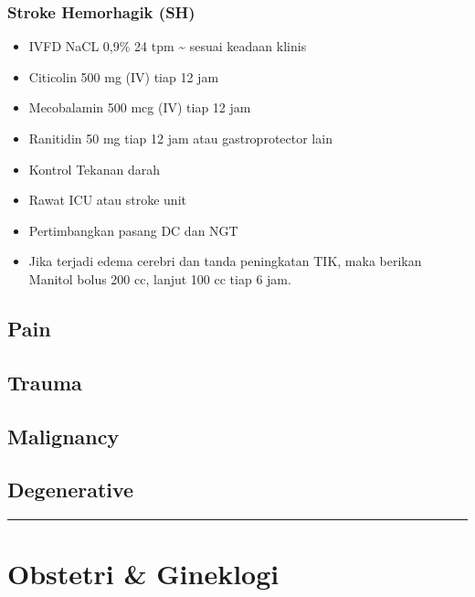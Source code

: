 \documentclass[
]{book}
\providecommand{\tightlist}{%
  \setlength{\itemsep}{0pt}\setlength{\parskip}{0pt}}
\begin{document}
\hypertarget{stroke-hemorhagik-sh}{%
\subsubsection{Stroke Hemorhagik (SH)}\label{stroke-hemorhagik-sh}}

\begin{itemize}
\tightlist
\item
  IVFD NaCL 0,9\% 24 tpm \textasciitilde{} sesuai keadaan klinis
\item
  Citicolin 500 mg (IV) tiap 12 jam
\item
  Mecobalamin 500 mcg (IV) tiap 12 jam
\item
  Ranitidin 50 mg tiap 12 jam atau gastroprotector lain
\item
  Kontrol Tekanan darah
\item
  Rawat ICU atau stroke unit
\item
  Pertimbangkan pasang DC dan NGT
\item
  Jika terjadi edema cerebri dan tanda peningkatan TIK, maka berikan Manitol bolus 200 cc, lanjut 100 cc tiap 6 jam.
\end{itemize}

\hypertarget{pain}{%
\subsection{Pain}\label{pain}}

\hypertarget{trauma-1}{%
\subsection{Trauma}\label{trauma-1}}

\hypertarget{malignancy-3}{%
\subsection{Malignancy}\label{malignancy-3}}

\hypertarget{degenerative}{%
\subsection{Degenerative}\label{degenerative}}

\begin{center}\rule{0.5\linewidth}{0.5pt}\end{center}

\hypertarget{obstetri-gineklogi-1}{%
\section{Obstetri \& Gineklogi}\label{obstetri-gineklogi-1}}
\end{document}
